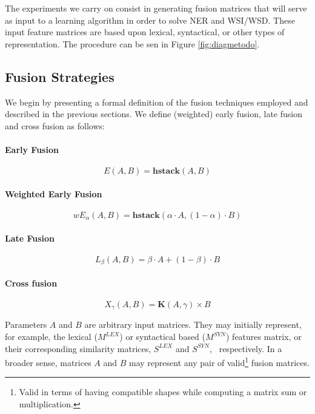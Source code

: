 \documentclass{llncs}
\begin{document}
The experiments we carry on consist in generating fusion matrices that will serve as input to a learning algorithm in order to solve NER and WSI/WSD. These input feature matrices are based upon lexical, syntactical, or other types of representation. The procedure can be sen in Figure \ref{fig:diagmetodo}.

\subsection{Fusion Strategies}
We begin by presenting a  formal definition of the fusion techniques employed and described in the previous sections. We define (weighted) early fusion, late fusion and cross fusion as follows:
\paragraph{Early Fusion}
\begin{equation}
E(A,B) = \mathbf{hstack}(A , B)
\end{equation}
\paragraph{Weighted Early Fusion}
\begin{equation}
wE_\alpha(A,B) = \mathbf{hstack}(\alpha\cdot A , (1-\alpha)\cdot B)
\end{equation}
\paragraph{Late Fusion}
\begin{equation} \label{eq:late-fusion}
L_\beta(A,B) = \beta \cdot A + (1 - \beta)\cdot B
\end{equation}
\paragraph{Cross fusion}
\begin{equation}
X_{\gamma}(A,B) = \mathbf{K}(A,\gamma) \times B
\end{equation}


Parameters $A$ and $B$ are arbitrary input matrices. They may initially represent, for example,  the lexical ($M^{LEX}$) or syntactical based ($M^{SYN}$) features matrix, or their  corresponding similarity matrices, $S^{LEX}$ and  $S^{SYN}$, ~respectively. In a broader sense, matrices $A$ and $B$ may represent any pair of valid\footnote{Valid in terms of having compatible shapes while computing a matrix sum or multiplication.} fusion matrices. 
\end{document}
